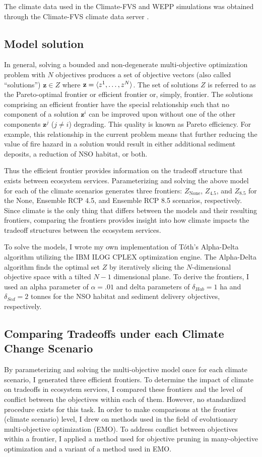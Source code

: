 The climate data used in the Climate-FVS and WEPP simulations was obtained through the Climate-FVS climate data server \cite{climateFVSReadyData}.

\subsection{Model solution}
In general, solving a bounded and non-degenerate multi-objective optimization problem with $N$ objectives produces a set of objective vectors (also called ``solutions'') $\mathbf{z} \in Z$ where $\mathbf{z}=\braket{z^1,\ldots,z^N}$. The set of solutions $Z$ is referred to as the Pareto-optimal frontier or efficient frontier or, simply, frontier. The solutions comprising an efficient frontier have the special relationship such that no component of a solution $\mathbf{z}^i$ can be improved upon without one of the other components $\mathbf{z}^j$ ($j \neq i$) degrading. This quality is known as Pareto efficiency. For example, this relationship in the current problem means that further reducing the value of fire hazard in a solution would result in either additional sediment deposits, a reduction of NSO habitat, or both.

Thus the efficient frontier provides information on the tradeoff structure that exists between ecosystem services. Parameterizing and solving the above model for each of the climate scenarios generates three frontiers: $Z_{\text{None}}$, $Z_{4.5}$, and $Z_{8.5}$ for the None, Ensemble RCP 4.5, and Ensemble RCP 8.5 scenarios, respectively. Since climate is the only thing that differs between the models and their resulting frontiers, comparing the frontiers provides insight into how climate impacts the tradeoff structures between the ecosystem services.

To solve the models, I wrote my own implementation of T\'{o}th's Alpha-Delta algorithm \cite{TothThesis} utilizing the IBM ILOG CPLEX optimization engine. The Alpha-Delta algorithm finds the optimal set $Z$ by iteratively slicing the $N$-dimensional objective space with a tilted $N-1$ dimensional plane. To derive the frontiers, I used an alpha parameter of $\alpha = .01$ and delta parameters of $\delta_{Hab} = 1$ ha and $\delta_{Sed} = 2$ tonnes for the NSO habitat and sediment delivery objectives, respectively.

\subsection{Comparing Tradeoffs under each Climate Change Scenario}
By parameterizing and solving the multi-objective model once for each climate scenario, I generated three efficient frontiers. To determine the impact of climate on tradeoffs in ecosystem services, I compared these frontiers and the level of conflict between the objectives within each of them. However, no standardized procedure exists for this task. In order to make comparisons at the frontier (climate scenario) level, I drew on methods used in the field of evolutionary multi-objective optimization (EMO). To address conflict between objectives within a frontier, I applied a method used for objective pruning in many-objective optimization and a variant of a method used in EMO.

